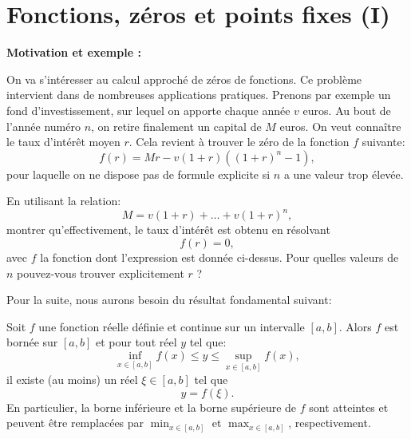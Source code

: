 


\newcommand{\eps}{\varepsilon}




\parindent0mm

\section{Fonctions, zéros et points fixes (I)}

{\bf Motivation et exemple :} 

\medskip

On va s'intéresser au calcul approché de zéros de fonctions. Ce problème intervient dans de nombreuses applications pratiques. Prenons par exemple un fond d'investissement, sur lequel on apporte chaque année $v$ euros. Au bout de l'année numéro $n$, on retire finalement un capital de $M$ euros. On veut connaître le taux d'intérêt moyen $r$. Cela revient à trouver le zéro de la fonction $f$ suivante:
\[
f(r) = M r - {v} ( 1 + r  ) \left ( (1 + r) ^n - 1 \right ),
\]
pour laquelle on ne dispose pas de formule explicite si $n$ a une valeur trop élevée.

\bigskip

\begin{exercice}

En utilisant la relation:
\[
M = v(1+r) + \dots + v(1+r)^n,
\]
montrer qu'effectivement, le taux d'intérêt est obtenu en résolvant 
\[
f(r) = 0,
\]
avec $f$ la fonction dont l'expression est donnée ci-dessus.
Pour quelles valeurs de $n$ pouvez-vous trouver explicitement $r$ ?
\end{exercice}


\bigskip

Pour la suite, nous aurons besoin du résultat fondamental suivant:

\begin{theorem}
Soit $f$ une fonction réelle définie et continue sur un intervalle $[a,b]$. Alors $f$ est bornée sur $[a,b]$ et pour tout réel $y$ tel que:
\[
\inf_{x \in [a,b]} f(x) \leq y \leq \sup_{x \in [a,b]} f(x),
\]
il existe (au moins) un réel $\xi \in [a,b]$ tel que 
\[
y = f(\xi).
\]
En particulier, la borne inférieure et la borne supérieure de $f$ sont atteintes et peuvent être remplacées par $\min_{x \in [a,b]}$ et $\max_{x \in [a,b]}$, respectivement.
\end{theorem}

